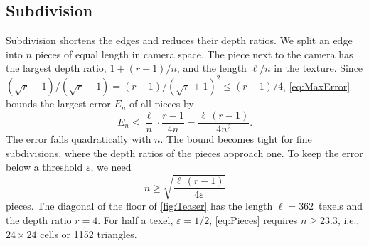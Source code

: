 \subsection{Subdivision}\label{sec:Subdivision}
Subdivision shortens the edges and reduces their depth ratios.
We split an edge into $n$ pieces of equal length in camera space.
The piece next to the camera has the largest depth ratio, $1 + (r - 1)/n$, and the length $\ell / n$ in the texture.
Since $(\sqrt{r} - 1)/(\sqrt{r} + 1) = (r - 1)/(\sqrt{r} + 1)^2 \le (r - 1)/4$, \cref{eq:MaxError} bounds the largest error $E_n$ of all pieces by
\begin{equation}
    E_n \le \frac{\ell}{n} \cdot \frac{r - 1}{4n} = \frac{\ell\,(r - 1)}{4n^2}.
    \label{eq:SubdivisionBound}
\end{equation}
The error falls quadratically with $n$.
The bound becomes tight for fine subdivisions, where the depth ratios of the pieces approach one.
To keep the error below a threshold $\varepsilon$, we need
\begin{equation}
    n \ge \sqrt{\frac{\ell\,(r - 1)}{4\varepsilon}}
    \label{eq:Pieces}
\end{equation}
pieces.
The diagonal of the floor of \cref{fig:Teaser} has the length $\ell = 362$~texels and the depth ratio $r = 4$.
For half a texel, $\varepsilon = 1/2$, \cref{eq:Pieces} requires $n \ge 23.3$, i.e., $24\times24$ cells or \num{1152} triangles.
